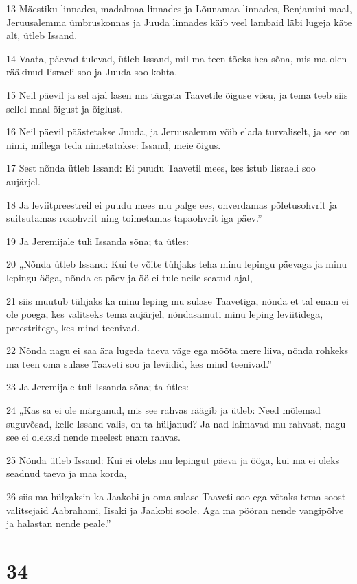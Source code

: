 \par 13 Mäestiku linnades, madalmaa linnades ja Lõunamaa linnades, Benjamini maal, Jeruusalemma ümbruskonnas ja Juuda linnades käib veel lambaid läbi lugeja käte alt, ütleb Issand.
\par 14 Vaata, päevad tulevad, ütleb Issand, mil ma teen tõeks hea sõna, mis ma olen rääkinud Iisraeli soo ja Juuda soo kohta.
\par 15 Neil päevil ja sel ajal lasen ma tärgata Taavetile õiguse võsu, ja tema teeb siis sellel maal õigust ja õiglust.
\par 16 Neil päevil päästetakse Juuda, ja Jeruusalemm võib elada turvaliselt, ja see on nimi, millega teda nimetatakse: Issand, meie õigus.
\par 17 Sest nõnda ütleb Issand: Ei puudu Taavetil mees, kes istub Iisraeli soo aujärjel.
\par 18 Ja leviitpreestreil ei puudu mees mu palge ees, ohverdamas põletusohvrit ja suitsutamas roaohvrit ning toimetamas tapaohvrit iga päev.”
\par 19 Ja Jeremijale tuli Issanda sõna; ta ütles:
\par 20 „Nõnda ütleb Issand: Kui te võite tühjaks teha minu lepingu päevaga ja minu lepingu ööga, nõnda et päev ja öö ei tule neile seatud ajal,
\par 21 siis muutub tühjaks ka minu leping mu sulase Taavetiga, nõnda et tal enam ei ole poega, kes valitseks tema aujärjel, nõndasamuti minu leping leviitidega, preestritega, kes mind teenivad.
\par 22 Nõnda nagu ei saa ära lugeda taeva väge ega mõõta mere liiva, nõnda rohkeks ma teen oma sulase Taaveti soo ja leviidid, kes mind teenivad.”
\par 23 Ja Jeremijale tuli Issanda sõna; ta ütles:
\par 24 „Kas sa ei ole märganud, mis see rahvas räägib ja ütleb: Need mõlemad suguvõsad, kelle Issand valis, on ta hüljanud? Ja nad laimavad mu rahvast, nagu see ei olekski nende meelest enam rahvas.
\par 25 Nõnda ütleb Issand: Kui ei oleks mu lepingut päeva ja ööga, kui ma ei oleks seadnud taeva ja maa korda,
\par 26 siis ma hülgaksin ka Jaakobi ja oma sulase Taaveti soo ega võtaks tema soost valitsejaid Aabrahami, Iisaki ja Jaakobi soole. Aga ma pööran nende vangipõlve ja halastan nende peale.”

\chapter{34}

